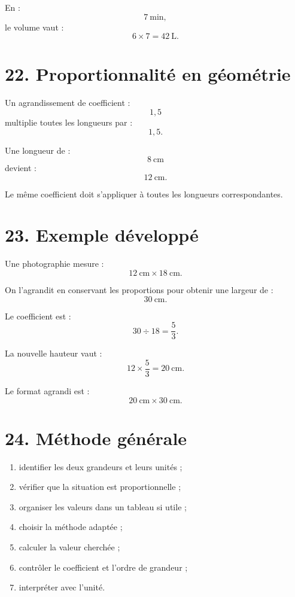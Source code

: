 En :
\[
7\ \text{min},
\]
le volume vaut :
\[
6\times7=42\ \text{L}.
\]

\section{22. Proportionnalité en géométrie}

Un agrandissement de coefficient :
\[
1{,}5
\]
multiplie toutes les longueurs par :
\[
1{,}5.
\]

Une longueur de :
\[
8\ \text{cm}
\]
devient :
\[
12\ \text{cm}.
\]

Le même coefficient doit s'appliquer à toutes les longueurs correspondantes.

\section{23. Exemple développé}

Une photographie mesure :
\[
12\ \text{cm}\times18\ \text{cm}.
\]

On l'agrandit en conservant les proportions pour obtenir une largeur de :
\[
30\ \text{cm}.
\]

Le coefficient est :
\[
30\div18=\dfrac53.
\]

La nouvelle hauteur vaut :
\[
12\times\dfrac53=20\ \text{cm}.
\]

Le format agrandi est :
\[
\boxed{20\ \text{cm}\times30\ \text{cm}}.
\]

\section{24. Méthode générale}

\begin{methode}
\begin{enumerate}
\item identifier les deux grandeurs et leurs unités ;
\item vérifier que la situation est proportionnelle ;
\item organiser les valeurs dans un tableau si utile ;
\item choisir la méthode adaptée ;
\item calculer la valeur cherchée ;
\item contrôler le coefficient et l'ordre de grandeur ;
\item interpréter avec l'unité.
\end{enumerate}
\end{methode}

